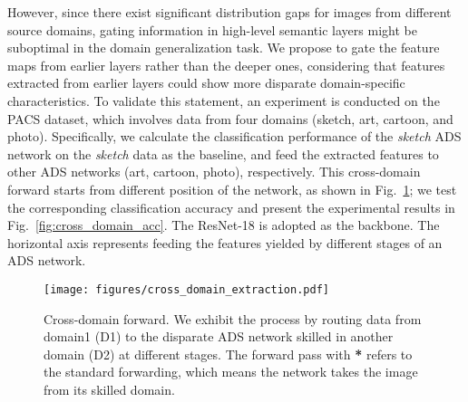 However, since there exist significant distribution gaps for images from different source domains, gating information in high-level semantic layers might be suboptimal in the domain generalization task. We propose to gate the feature maps from earlier layers rather than the deeper ones, considering that features extracted from earlier layers could show more disparate domain-specific characteristics. To validate this statement, an experiment is conducted on the PACS dataset, which involves data from four domains (\ie sketch, art, cartoon, and photo). Specifically, we calculate the classification performance of the \textit{sketch} ADS network on the \textit{sketch} data as the baseline, and feed the extracted features to other ADS networks (art, cartoon, photo), respectively. This cross-domain forward starts from different position of the network, as shown in Fig.~\ref{fig:cross_domain_extraction}; we test the corresponding classification accuracy and present the experimental results in Fig.~\ref{fig:cross_domain_acc}. The ResNet-18 is adopted as the backbone. The horizontal axis represents feeding the features yielded by different stages of an ADS network.

\begin{figure}[tb]
  \centering
  \texttt{[image: figures/cross\_domain\_extraction.pdf]}
  \caption{Cross-domain forward. We exhibit the process by routing data from domain1 (D1) to the disparate ADS network skilled in another domain (D2) at different stages. The forward pass with \textbf{*} refers to the standard forwarding, which means the network takes the image from its skilled domain.}
  \label{fig:cross_domain_extraction}
\end{figure}


